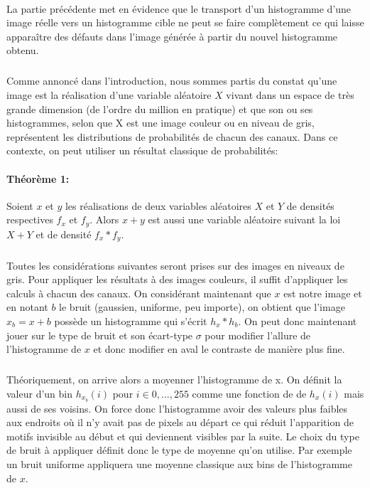\documentclass{report}
\begin{document}
\paragraph*{}
La partie précédente met en évidence que le transport d'un histogramme d'une image réelle vers un histogramme cible ne peut se faire complètement ce qui laisse apparaître des défauts dans l'image générée à partir du nouvel histogramme obtenu.
\subparagraph*{}
Comme annoncé dans l'introduction, nous sommes partis du constat qu'une image est la réalisation d'une variable aléatoire $X$ vivant dans un espace de très grande dimension (de l'ordre du million en pratique) et que son ou ses histogrammes, selon que X est une image couleur ou en niveau de gris, représentent les distributions de probabilités de chacun des canaux. Dans ce contexte, on peut utiliser un résultat classique de probabilités:
\newline
\paragraph{Théorème 1:} Soient $x$ et $y$ les réalisations de deux variables aléatoires $X$ et $Y$ de densités respectives $f_x$ et $f_y$. Alors $x+y$ est aussi une variable aléatoire suivant la loi $X+Y$ et de densité $f_x * f_y$.
\subparagraph{} Toutes les considérations suivantes seront prises sur des images en niveaux de gris. Pour appliquer les résultats à des images couleurs, il suffit d'appliquer les calculs à chacun des canaux. On considérant maintenant que $x$ est notre image et en notant $b$ le bruit (gaussien, uniforme, peu importe), on obtient que l'image $x_b = x+b$ possède un histogramme qui s'écrit $h_x * h_b$. On peut donc maintenant jouer sur le type de bruit et son écart-type $\sigma$ pour modifier l'allure de l'histogramme  de $x$ et donc modifier en aval le contraste de manière plus fine.
\subparagraph*{} Théoriquement, on arrive alors a moyenner l'histogramme de x. On définit la valeur d'un bin $h_{x_b}(i)$ pour $i \in {0,...,255}$ comme une fonction de de $h_x(i)$ mais aussi de ses voisins. On force donc l'histogramme avoir des valeurs plus faibles aux endroits où il n'y avait pas de pixels au départ ce qui réduit l'apparition de motifs invisible au début et qui deviennent visibles par la suite. Le choix du type de bruit à appliquer définit donc le type de moyenne qu'on utilise. Par exemple un bruit uniforme appliquera une moyenne classique aux bins de l'histogramme de $x$.
\end{document}
